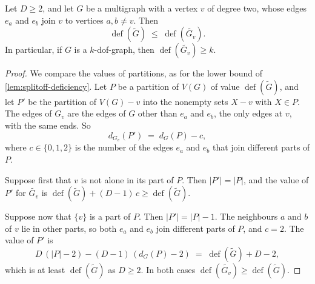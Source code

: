 \begin{lemma}
  \label{lem:removal-deficiency}
  \leanok
  Let $D \ge 2$, and let $G$ be a multigraph with a vertex $v$ of degree
  two, whose edges $e_a$ and $e_b$ join $v$ to vertices $a, b \neq v$.
  Then
  \[
    \operatorname{def}(\tilde G) \;\le\;
    \operatorname{def}(\widetilde{G_v}).
  \]
  In particular, if $G$ is a $k$-dof-graph, then
  $\operatorname{def}(\widetilde{G_v}) \ge k$.
\end{lemma}
\begin{proof}
  \leanok
  We compare the values of partitions, as for the lower bound of
  \cref{lem:splitoff-deficiency}. Let $P$ be a partition of $V(G)$ of
  value $\operatorname{def}(\tilde G)$, and let $P'$ be the partition of
  $V(G) - v$ into the nonempty sets $X - v$ with $X \in P$. The edges of
  $G_v$ are the edges of $G$ other than $e_a$ and $e_b$, the only edges
  at $v$, with the same ends. So
  \[
    d_{G_v}(P') \;=\; d_G(P) - c,
  \]
  where $c \in \{0, 1, 2\}$ is the number of the edges $e_a$ and $e_b$
  that join different parts of $P$.

  Suppose first that $v$ is not alone in its part of $P$. Then
  $|P'| = |P|$, and the value of $P'$ for $\widetilde{G_v}$ is
  $\operatorname{def}(\tilde G) + (D - 1)\,c \ge \operatorname{def}(\tilde G)$.

  Suppose now that $\{v\}$ is a part of $P$. Then $|P'| = |P| - 1$. The
  neighbours $a$ and $b$ of $v$ lie in other parts, so both $e_a$ and
  $e_b$ join different parts of $P$, and $c = 2$. The value of $P'$ is
  \[
    D\,(|P| - 2) - (D - 1)\,(d_G(P) - 2) \;=\;
    \operatorname{def}(\tilde G) + D - 2,
  \]
  which is at least $\operatorname{def}(\tilde G)$ as $D \ge 2$. In both
  cases $\operatorname{def}(\widetilde{G_v}) \ge \operatorname{def}(\tilde G)$.
\end{proof}

